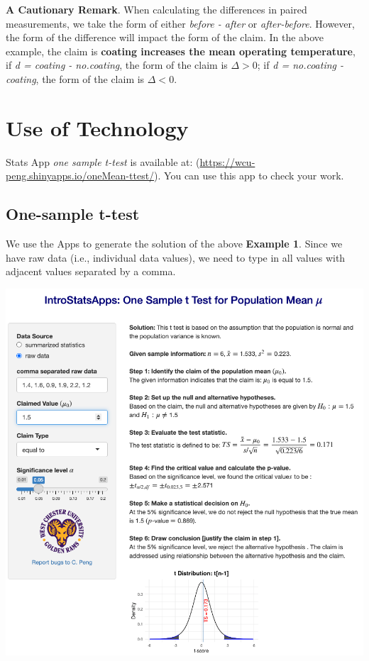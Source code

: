 \documentclass[
]{book}
\begin{document}
\textbf{A Cautionary Remark}. When calculating the differences in paired measurements, we take the form of either \emph{before - after} or \emph{after-before}. However, the form of the difference will impact the form of the claim. In the above example, the claim is \textbf{coating increases the mean operating temperature}, if \emph{d = coating - no.coating}, the form of the claim is \(\Delta > 0\); if \emph{d = no.coating - coating}, the form of the claim is \(\Delta < 0\).

\hfill\break

\hypertarget{use-of-technology-8}{%
\section{Use of Technology}\label{use-of-technology-8}}

Stats App \emph{one sample t-test} is available at: (\url{https://wcu-peng.shinyapps.io/oneMean-ttest/}). You can use this app to check your work.

\hypertarget{one-sample-t-test}{%
\subsection{One-sample t-test}\label{one-sample-t-test}}

We use the Apps to generate the solution of the above \textbf{Example 1}. Since we have raw data (i.e., individual data values), we need to type in all values with adjacent values separated by a comma.

\begin{center}\includegraphics[width=1\linewidth]{week10/techOneSample} \end{center}
\end{document}
